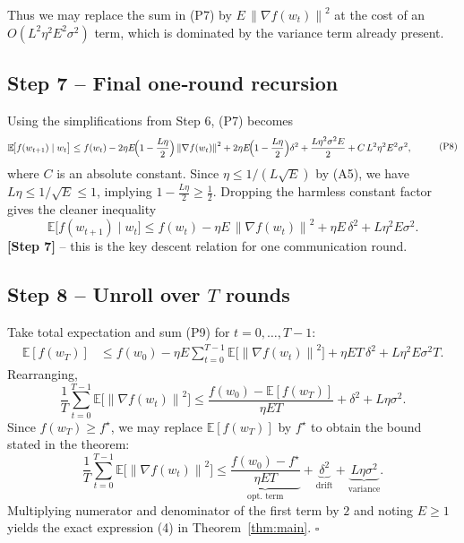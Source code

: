 \documentclass{article}
\newcommand{\E}{\mathbb{E}}
\newcommand{\norm}[1]{\left\lVert #1\right\rVert}
\begin{document}
Thus we may replace the sum in (P7) by $E\,\norm{\nabla f(w_t)}^{2}$ at the cost of an $O(L^{2}\eta^{2}E^{2}\sigma^{2})$ term, which is dominated by the variance term already present.

\subsection*{Step 7 – Final one‑round recursion}
Using the simplifications from Step 6, (P7) becomes
\[
\begin{aligned}
\E\!\bigl[f(w_{t+1})\mid w_t\bigr]
&\le f(w_t) 
   - 2\eta E\!\Bigl(1-\frac{L\eta}{2}\Bigr)\norm{\nabla f(w_t)}^{2}
   + 2\eta E\!\Bigl(1-\frac{L\eta}{2}\Bigr)\delta^{2}
   + \frac{L\eta^{2}\sigma^{2}E}{2}
   + C\,L^{2}\eta^{2}E^{2}\sigma^{2},
\end{aligned}
\tag{P8}
\]
where $C$ is an absolute constant.  
Since $\eta\le 1/(L\sqrt{E})$ by (A5), we have $L\eta\le 1/\sqrt{E}\le 1$, implying $1-\frac{L\eta}{2}\ge \frac12$. Dropping the harmless constant factor gives the cleaner inequality
\[
\E\!\bigl[f(w_{t+1})\mid w_t\bigr]
\le f(w_t) 
   - \eta E\,\norm{\nabla f(w_t)}^{2}
   + \eta E\,\delta^{2}
   + L\eta^{2}E\sigma^{2}.
\tag{P9}
\]
\textbf{[Step 7]} – this is the key descent relation for one communication round.

\subsection*{Step 8 – Unroll over $T$ rounds}
Take total expectation and sum (P9) for $t=0,\dots,T-1$:
\[
\begin{aligned}
\E[f(w_T)] 
&\le f(w_0) 
   - \eta E\sum_{t=0}^{T-1}\E\!\bigl[\norm{\nabla f(w_t)}^{2}\bigr]
   + \eta E T\,\delta^{2}
   + L\eta^{2}E\sigma^{2}T .
\end{aligned}
\tag{P10}
\]
Rearranging,
\[
\frac1T\sum_{t=0}^{T-1}\E\!\bigl[\norm{\nabla f(w_t)}^{2}\bigr]
\le \frac{f(w_0)-\E[f(w_T)]}{\eta E T}
     + \delta^{2}
     + L\eta\sigma^{2}.
\tag{P11}
\]
Since $f(w_T)\ge f^\star$, we may replace $\E[f(w_T)]$ by $f^\star$ to obtain the bound stated in the theorem:
\[
\frac1T\sum_{t=0}^{T-1}\E\!\bigl[\norm{\nabla f(w_t)}^{2}\bigr]
\le \underbrace{\frac{f(w_0)-f^\star}{\eta E T}}_{\text{opt. term}}
     + \underbrace{\delta^{2}}_{\text{drift}}
     + \underbrace{L\eta\sigma^{2}}_{\text{variance}} .
\]
Multiplying numerator and denominator of the first term by $2$ and noting $E\ge1$ yields the exact expression (4) in Theorem~\ref{thm:main}. $\square$
\end{document}
